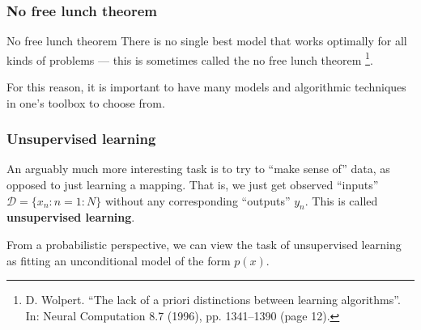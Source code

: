 \documentclass[spanish]{beamer}
\begin{document}
\begin{frame}
\frametitle{No free lunch theorem}
\begin{block}{No free lunch theorem}
There is no single best model that works optimally for all kinds of problems — this
is sometimes called the no free lunch theorem \footnote{ D. Wolpert. “The lack of a priori distinctions
between learning algorithms”. In: Neural Computation
8.7 (1996), pp. 1341–1390 (page 12).}.
\end{block}
For this reason, it is important to have many models and algorithmic techniques in one’s toolbox to choose
from.


\end{frame}
\begin{frame}
\frametitle{Unsupervised learning}
An arguably much more interesting task is to try to “make sense of” data, as opposed to just
learning a mapping. That is, we just get observed “inputs” $ \mathcal{D}  = \lbrace x_n : n = 1 : N\rbrace$ without any
corresponding “outputs” $y_{n}$. This is called \textbf{unsupervised learning}.


From a probabilistic perspective, we can view the task of unsupervised learning as fitting an
unconditional model of the form $p(x)$.
\end{frame}
\end{document}
